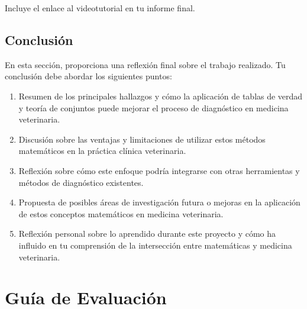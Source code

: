 \documentclass[a4,11pt]{aleph-notas}
\begin{document}
Incluye el enlace al videotutorial en tu informe final.

\subsection{Conclusión}
En esta sección, proporciona una reflexión final sobre el trabajo realizado. Tu conclusión debe abordar los siguientes puntos:

\begin{enumerate}
    \item Resumen de los principales hallazgos y cómo la aplicación de tablas de verdad y teoría de conjuntos puede mejorar el proceso de diagnóstico en medicina veterinaria.
    
    \item Discusión sobre las ventajas y limitaciones de utilizar estos métodos matemáticos en la práctica clínica veterinaria.
    
    \item Reflexión sobre cómo este enfoque podría integrarse con otras herramientas y métodos de diagnóstico existentes.
    
    \item Propuesta de posibles áreas de investigación futura o mejoras en la aplicación de estos conceptos matemáticos en medicina veterinaria.
    
    \item Reflexión personal sobre lo aprendido durante este proyecto y cómo ha influido en tu comprensión de la intersección entre matemáticas y medicina veterinaria.
\end{enumerate}


\section{Guía de Evaluación}
\end{document}
